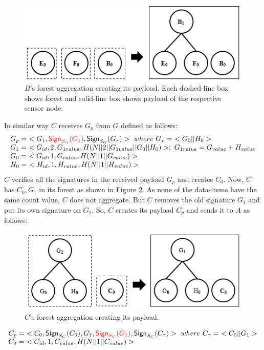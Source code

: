 		\begin{figure}[h!]
			\centering
			\includegraphics[scale=1]{images/b-forest-payload.png}
			\caption{$B$'s forest aggregation creating its payload.
			 				Each dashed-line box shows forest and solid-line box shows payload of the respective sensor node.}
			\label{fig:b-forest-payload}
		\end{figure}

		In similar way $C$ receives $G_{p}$ from $G$ defined as follows:
		\begin{equation}
			\begin{array}{l}
				G_{p} =\ <G_{1},\textcolor{red}{\textsf{Sign}_{S_{G}}(G_{1})}, \textsf{Sign}_{S_{G}}(G_{\tau})>\ where\ G_{\tau} =\ <G_{0} || H_{0}>\\
				G_{1} =\ < G_{id}, 2, G_{1value}, H(N||2||G_{1value}||G_{0}||H_{0})>;\ G_{1value} = G_{value} + H_{value} \\
				G_{0} =\ <G_{id}, 1, G_{value}, H(N||1||G_{value})>\\
				H_{0} =\ <H_{id}, 1, H_{value}, H(N||1||H_{value})>
			\end{array}
		\end{equation}
		$C$ verifies all the signatures in the received payload $G_{p}$ and creates $C_{0}$.
		Now, $C$ has $C_{0},G_{1}$ in its forest as shown in Figure \ref{fig:c-forest-payload}. 
		As none of the data-items have the same count value, $C$ does not aggregate.
		But $C$ removes the old signature $G_{1}$ and put its own signature on $G_{1}$.
		So, $C$ creates its payload $C_{p}$ and sends it to $A$ as follows:
		\begin{figure}[h!]
			\centering
			\includegraphics[scale=1]{images/c-forest-payload.png}
			\caption{$C$'s forest aggregation creating its payload.}
			\label{fig:c-forest-payload}
		\end{figure}
		\begin{equation}
			\begin{array}{l}
				C_{p} =\ <C_{0},\textsf{Sign}_{S_{C}}(C_{0}),G_{1},\textcolor{red}{\textsf{Sign}_{S_{C}}(G_{1})}, \textsf{Sign}_{S_{C}}(C_{\tau})>\ where\ C_{\tau} =\ <C_{0} || G_{1}>\\
				C_{0} =\ <C_{id}, 1, C_{value}, H(N||1||C_{value})>
			\end{array}
			\label{eq:c-payload}
		\end{equation}

